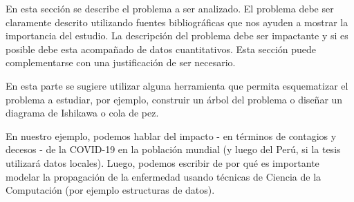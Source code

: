 \label{section:problema}

En esta sección se describe el problema a ser analizado. El problema debe ser claramente descrito utilizando fuentes bibliográficas que nos ayuden a mostrar la importancia del estudio. La descripción del problema debe ser impactante y si es posible debe esta acompañado de datos cuantitativos. Esta sección puede complementarse con una justificación de ser necesario.

En esta parte se sugiere utilizar alguna herramienta que permita esquematizar el problema a estudiar, por ejemplo, construir un árbol del problema o diseñar un diagrama de Ishikawa o cola de pez.  \\

\begin{tcolorbox}[colback=blue!5!white,colframe=blue!75!black,title=Ejemplo]
En nuestro ejemplo, podemos hablar del impacto - en términos de contagios y decesos - de la COVID-19 en la población mundial (y luego del Perú, si la tesis utilizará datos locales). Luego, podemos escribir de por qué es importante modelar la propagación de la enfermedad usando técnicas de Ciencia de la Computación (por ejemplo estructuras de datos).
\end{tcolorbox}
